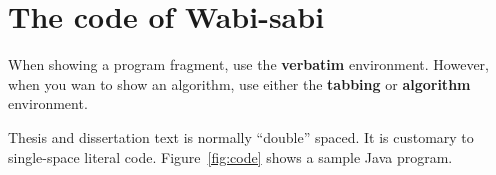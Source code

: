 \documentclass[dissertation]{bsu-cs}  %
\begin{document}
\section{The code of Wabi-sabi}

When showing a program fragment, use the \textbf{verbatim} environment. However, when you wan
to show an algorithm, use either the \textbf{tabbing} or \textbf{algorithm} environment.

Thesis and dissertation text is normally ``double'' spaced.  It is customary to single-space
literal code.  Figure~\ref{fig:code} shows a sample Java program.

%
%
%
%
\end{document}
